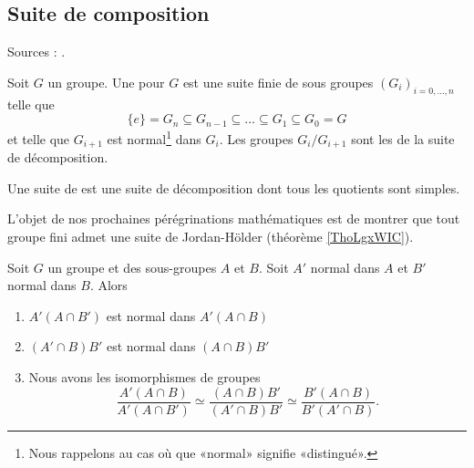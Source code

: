 \subsection{Suite de composition}


Sources : \cite{NjCCfW,jxWKGB}.

\begin{definition}
Soit \( G\) un groupe. Une  pour \( G\) est une suite finie de sous groupes \( (G_i)_{i=0,\ldots, n}\) telle que
\begin{equation}
    \{ e \}=G_n\subseteq G_{n-1}\subseteq\ldots\subseteq G_1\subseteq G_0=G
\end{equation}
et telle que \( G_{i+1}\) est normal\footnote{Nous rappelons au cas où que «normal» signifie «distingué».} dans \( G_i\). Les groupes \( G_i/G_{i+1}\) sont les  de la suite de décomposition.

    Une suite de  est une suite de décomposition dont tous les quotients sont simples.
\end{definition}
L'objet de nos prochaines pérégrinations mathématiques est de montrer que tout groupe fini admet une suite de Jordan-Hölder (théorème \ref{ThoLgxWIC}).

\begin{lemma}\label{LemsKpXCG}
    Soit \( G\) un groupe et des sous-groupes \( A\) et \( B\). Soit \( A'\) normal dans \( A\) et \( B'\) normal dans \( B\). Alors
    \begin{enumerate}
        \item
            \( A'(A\cap B')\) est normal dans \( A'(A\cap B)\)
        \item
            \( (A'\cap B)B'\) est normal dans \( (A\cap B)B'\)
        \item
            Nous avons les isomorphismes de groupes
            \begin{equation}
                \frac{ A'(A\cap B) }{ A'(A\cap B') }\simeq\frac{ (A\cap B)B' }{ (A'\cap B)B' }\simeq\frac{ B'(A\cap B) }{ B'(A'\cap B) }.
            \end{equation}
    \end{enumerate}
\end{lemma}

